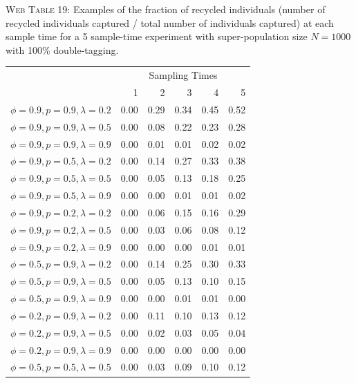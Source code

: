 \documentclass[]{article}
\begin{document}
\clearpage

\textsc{Web Table 19:} Examples of the fraction of recycled individuals
(number of recycled individuals captured / total number of individuals
captured) at each sample time for a 5 sample-time experiment with
super-population size \(N=1000\) with 100\% double-tagging.

\begin{table}[ht]
\begin{tabular}{rrrrrr}
  \hline
  & \multicolumn{5}{c}{Sampling Times}\\
 & 1 & 2 & 3 & 4 & 5 \\ 
  \hline
 $\phi=0.9, p=0.9, \lambda=0.2$  & 0.00 & 0.29 & 0.34 & 0.45 & 0.52 \\ 
  $\phi=0.9, p=0.9, \lambda=0.5$  & 0.00 & 0.08 & 0.22 & 0.23 & 0.28 \\ 
  $\phi=0.9, p=0.9, \lambda=0.9$  & 0.00 & 0.01 & 0.01 & 0.02 & 0.02 \\ \hline 
  $\phi=0.9, p=0.5, \lambda=0.2$  & 0.00 & 0.14 & 0.27 & 0.33 & 0.38 \\ 
  $\phi=0.9, p=0.5, \lambda=0.5$  & 0.00 & 0.05 & 0.13 & 0.18 & 0.25 \\ 
  $\phi=0.9, p=0.5, \lambda=0.9$  & 0.00 & 0.00 & 0.01 & 0.01 & 0.02 \\ \hline
  $\phi=0.9, p=0.2, \lambda=0.2$  & 0.00 & 0.06 & 0.15 & 0.16 & 0.29 \\ 
  $\phi=0.9, p=0.2, \lambda=0.5$ & 0.00 & 0.03 & 0.06 & 0.08 & 0.12 \\ 
  $\phi=0.9, p=0.2, \lambda=0.9$ & 0.00 & 0.00 & 0.00 & 0.01 & 0.01 \\ \hline
  $\phi=0.5, p=0.9, \lambda=0.2$ & 0.00 & 0.14 & 0.25 & 0.30 & 0.33 \\ 
  $\phi=0.5, p=0.9, \lambda=0.5$ & 0.00 & 0.05 & 0.13 & 0.10 & 0.15 \\ 
  $\phi=0.5, p=0.9, \lambda=0.9$ & 0.00 & 0.00 & 0.01 & 0.01 & 0.00 \\ \hline
  $\phi=0.2, p=0.9, \lambda=0.2$ & 0.00 & 0.11 & 0.10 & 0.13 & 0.12 \\ 
  $\phi=0.2, p=0.9, \lambda=0.5$  & 0.00 & 0.02 & 0.03 & 0.05 & 0.04 \\ 
  $\phi=0.2, p=0.9, \lambda=0.9$  & 0.00 & 0.00 & 0.00 & 0.00 & 0.00 \\ \hline
    $\phi=0.5, p=0.5, \lambda=0.5$ & 0.00 & 0.03 & 0.09 & 0.10 & 0.12 \\ \hline
\end{tabular}
\end{table}
\end{document}
